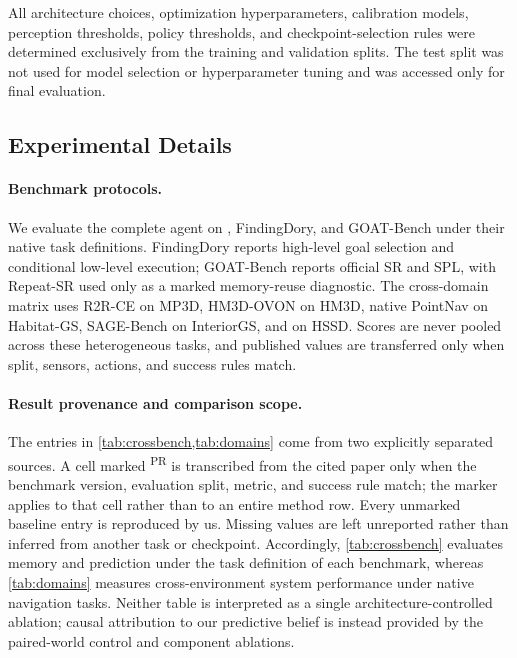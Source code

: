 All architecture choices, optimization hyperparameters, calibration models,
perception thresholds, policy thresholds, and checkpoint-selection rules were
determined exclusively from the training and validation splits. The test split
was not used for model selection or hyperparameter tuning and was accessed only
for final evaluation.

\subsection{Experimental Details}
\label{app:experimental-setup}

\paragraph{Benchmark protocols.}
We evaluate the complete agent on \evolvingworldbench{}, FindingDory, and GOAT-Bench
under their native task definitions. FindingDory reports high-level goal
selection and conditional low-level execution; GOAT-Bench reports official SR
and SPL, with Repeat-SR used only as a marked memory-reuse diagnostic. The
cross-domain matrix uses R2R-CE on MP3D, HM3D-OVON on HM3D, native PointNav on
Habitat-GS, SAGE-Bench on InteriorGS, and \evolvingworldbench{} on HSSD. Scores are never
pooled across these heterogeneous tasks, and published values are transferred
only when split, sensors, actions, and success rules match.

\paragraph{Result provenance and comparison scope.}
The entries in \cref{tab:crossbench,tab:domains} come from two explicitly
separated sources. A cell marked \textsuperscript{PR} is transcribed from the
cited paper only when the benchmark version, evaluation split, metric, and
success rule match; the marker applies to that cell rather than to an entire
method row. Every unmarked baseline entry is reproduced by us. Missing values
are left unreported rather than inferred from another task or checkpoint.
Accordingly, \cref{tab:crossbench} evaluates memory and prediction under the task definition of each
benchmark, whereas \cref{tab:domains} measures
cross-environment system performance under native navigation tasks. Neither
table is interpreted as a single architecture-controlled ablation; causal
attribution to our predictive belief is instead provided by the paired-world
control and component ablations.

